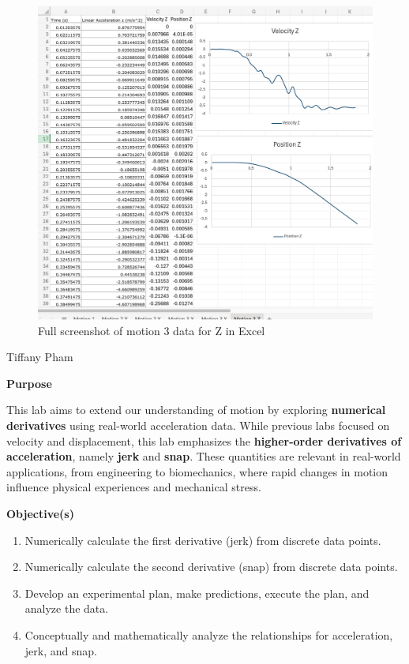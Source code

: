 \documentclass[idxtotoc,hyperref,openany]{labbook} %
\begin{document}
\begin{figure}[H] %
\begin{center}
\includegraphics[width=1.2\linewidth]{images/Lab.03/Lab03Motion3ZExcel.png}
\end{center}
\caption{Full screenshot of motion 3 data for Z in Excel}
\label{fig:Lab03-Motion3-Z-Excel}
\end{figure}


\vspace{-5mm}
\vspace{-5mm}
Tiffany Pham

\textbf{Purpose}

This lab aims to extend our understanding of motion by exploring \textbf{numerical derivatives} using real-world acceleration data. While previous labs focused on velocity and displacement, this lab emphasizes the \textbf{higher-order derivatives of acceleration}, namely \textbf{jerk} and \textbf{snap}. These quantities are relevant in real-world applications, from engineering to biomechanics, where rapid changes in motion influence physical experiences and mechanical stress.

\hfill \break
\textbf{Objective(s)}
\begin{enumerate}[$\bullet$]
    \item Numerically calculate the first derivative (jerk) from discrete data points.
    \item Numerically calculate the second derivative (snap) from discrete data points.
    \item Develop an experimental plan, make predictions, execute the plan, and analyze the data.
    \item Conceptually and mathematically analyze the relationships for acceleration, jerk, and snap.
\end{enumerate}
\end{document}

